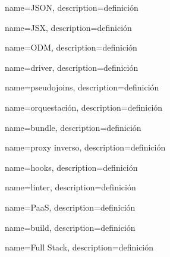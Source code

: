 {
name={JSON},
description={definición}
}

{
name={JSX},
description={definición}
}

{
name={ODM},
description={definición}
}

{
name={driver},
description={definición}
}

{
name={pseudojoins},
description={definición}
}

{
name={orquestación},
description={definición}
}

{
name={bundle},
description={definición}
}

{
name={proxy inverso},
description={definición}
}

{
name={hooks},
description={definición}
}

{
name={linter},
description={definición}
}

{
name={PaaS},
description={definición}
}

{
name={build},
description={definición}
}

{
name={Full Stack},
description={definición}
}
